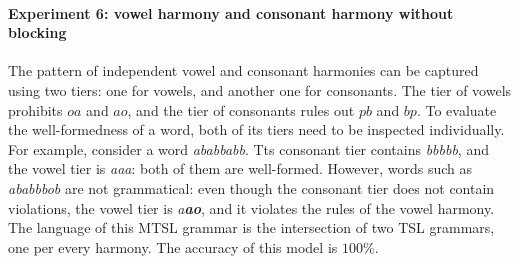 \begin{table}[h!]
\centering
{}
\caption{MTSL learning of several harmonies with blockers; raw representation.}
\end{table}


\paragraph{Experiment 6: vowel harmony and consonant harmony without blocking}

The pattern of independent vowel and consonant harmonies can be captured using two tiers: one for vowels, and another one for consonants.
The tier of vowels prohibits $oa$ and $ao$, and the tier of consonants rules out $pb$ and $bp$.
To evaluate the well-formedness of a word, both of its tiers need to be inspected individually.
For example, consider a word \emph{ababbabb}.
Tts consonant tier contains \emph{bbbbb}, and the vowel tier is \emph{aaa}: both of them are well-formed.
However, words such as \emph{ababbbob} are not grammatical: even though the consonant tier does not contain violations, the vowel tier is \emph{a\textbf{ao}}, and it violates the rules of the vowel harmony.
The language of this MTSL grammar is the intersection of two TSL grammars, one per every harmony.
The accuracy of this model is $100$\%.

